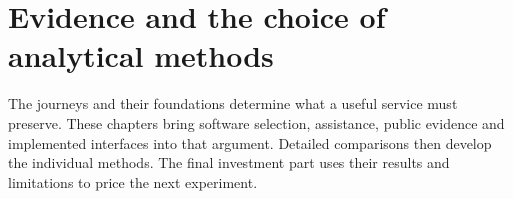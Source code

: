 
\part{Evidence and the choice of analytical methods}
\label{rewrite:part-synthesis}
The journeys and their foundations determine what a useful service must
preserve. These chapters bring software selection, assistance, public
evidence and implemented interfaces into that argument. Detailed comparisons
then develop the individual methods. The final investment part uses their
results and limitations to price the next experiment.


